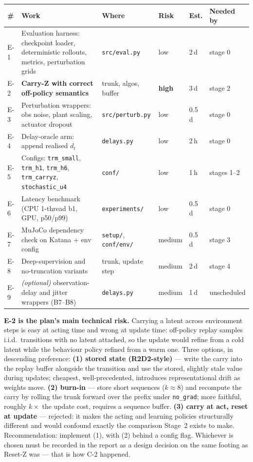 \documentclass[11pt]{article}
\newcommand{\code}[1]{\texttt{\small #1}}
\begin{document}
\begin{center}\footnotesize
\begin{tabular}{@{}lp{}p{}lll@{}}
\toprule
\textbf{\#} & \textbf{Work} & \textbf{Where} & \textbf{Risk} & \textbf{Est.} & \textbf{Needed by} \\
\midrule
E-1 & Evaluation harness: checkpoint loader, deterministic rollouts, metrics, perturbation grids & \code{src/eval.py} & low & 2\,d & stage 0 \\
E-2 & \textbf{Carry-Z with correct off-policy semantics} & trunk, algos, buffer & \textbf{high} & 3\,d & stage 2 \\
E-3 & Perturbation wrappers: obs noise, plant scaling, actuator dropout & \code{src/perturb.py} & low & 0.5\,d & stage 0 \\
E-4 & Delay-oracle arm: append realised $d_t$ & \code{delays.py} & low & 2\,h & stage 0 \\
E-5 & Configs: \code{trm\_small}, \code{trm\_h1}, \code{trm\_h6}, \code{trm\_carryz}, \code{stochastic\_u4} & \code{conf/} & low & 1\,h & stages 1--2 \\
E-6 & Latency benchmark (CPU 1-thread b1, GPU, p50/p99) & \code{experiments/} & low & 0.5\,d & stage 0 \\
E-7 & MuJoCo dependency check on Katana + env config & \code{setup/}, \code{conf/env/} & medium & 0.5\,d & stage 3 \\
E-8 & Deep-supervision and no-truncation variants & trunk, update step & medium & 2\,d & stage 4 \\
E-9 & \emph{(optional)} observation-delay and jitter wrappers (B7--B8) & \code{delays.py} & medium & 1\,d & unscheduled \\
\bottomrule
\end{tabular}
\end{center}

\textbf{E-2 is the plan's main technical risk.} Carrying a latent across environment steps is easy at acting time and wrong at update time: off-policy replay samples i.i.d.\ transitions with no latent attached, so the update would refine from a cold latent while the behaviour policy refined from a warm one. Three options, in descending preference: \textbf{(1) stored state (R2D2-style)} --- write the carry into the replay buffer alongside the transition and use the stored, slightly stale value during updates; cheapest, well-precedented, introduces representational drift as weights move. \textbf{(2) burn-in} --- store short sequences ($k \approx 8$) and recompute the carry by rolling the trunk forward over the prefix under \code{no\_grad}; more faithful, roughly $k\times$ the update cost, requires a sequence buffer. \textbf{(3) carry at act, reset at update} --- rejected: it makes the acting and learning policies structurally different and would confound exactly the comparison Stage~2 exists to make. Recommendation: implement (1), with (2) behind a config flag. Whichever is chosen must be recorded in the report as a design decision on the same footing as Reset-Z was --- that is how C-2 happened.
\end{document}
